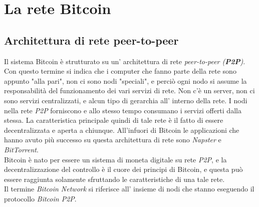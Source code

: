 \section{La rete Bitcoin }

\subsection{Architettura di rete peer-to-peer}
Il sistema Bitcoin \`e strutturato su un' architettura di rete \textit{peer-to-peer (\textbf{P2P})}. Con questo termine si indica che i computer che fanno parte della rete sono appunto "alla pari", non ci sono nodi "speciali", e perci\`o ogni nodo si assume la responsabilit\`a del funzionamento dei vari servizi di rete. Non c'\`e un server, non ci sono servizi centralizzati, e alcun tipo di gerarchia all' interno della rete. I nodi nella rete \textit{P2P} forniscono e allo stesso tempo consumano i servizi offerti dalla stessa. La caratteristica principale quindi di tale rete \`e il fatto di essere decentralizzata e aperta a chiunque. All'infuori di Bitcoin le applicazioni che hanno avuto pi\`u successo su questa architettura di rete sono \textit{Napster} e  \textit{BitTorrent}.\\
Bitcoin \`e nato per essere un sistema di moneta digitale su rete \textit{P2P}, e la decentralizzazione del controllo \`e il cuore dei principi di Bitcoin, e questa pu\`o essere raggiunta solamente sfruttando le caratteristiche di una tale rete.\\
Il termine \textit{Bitcoin Network} si riferisce all' insieme di nodi che stanno eseguendo il protocollo \textit{Bitcoin P2P}.

